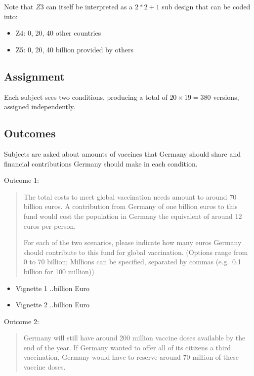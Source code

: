 \documentclass[12pt,oneside]{article}
\begin{document}
Note that \(Z3\) can itself be interpreted as a \(2*2+1\) sub design
that can be coded into:

\begin{itemize}
	\item
	Z4: 0, 20, 40 other countries
	\item
	Z5: 0, 20, 40 billion provided by others
\end{itemize}

\hypertarget{assignment-1}{%
	\subsection{Assignment}\label{assignment-1}}

Each subject sees two conditions, producing a total of
\(20 \times 19 = 380\) versions, assigned independently.

\hypertarget{outcomes-1}{%
	\subsection{Outcomes}\label{outcomes-1}}

Subjects are asked about amounts of vaccines that Germany should share
and financial contributions Germany should make in each condition.

Outcome 1:

\begin{quote}
	The total costs to meet global vaccination needs amount to around 70
	billion euros. A contribution from Germany of one billion euros to this
	fund would cost the population in Germany the equivalent of around 12
	euros per person.
	
	For each of the two scenarios, please indicate how many euros Germany
	should contribute to this fund for global vaccination. (Options range
	from 0 to 70 billion; Millions can be specified, separated by commas
	(e.g.~0.1 billion for 100 million))
\end{quote}

\begin{itemize}
	\item
	Vignette 1 ..billion Euro
	\item
	Vignette 2 ..billion Euro
\end{itemize}

Outcome 2:

\begin{quote}
	Germany will still have around 200 million vaccine doses available by
	the end of the year. If Germany wanted to offer all of its citizens a
	third vaccination, Germany would have to reserve around 70 million of
	these vaccine doses.
\end{quote}
\end{document}
